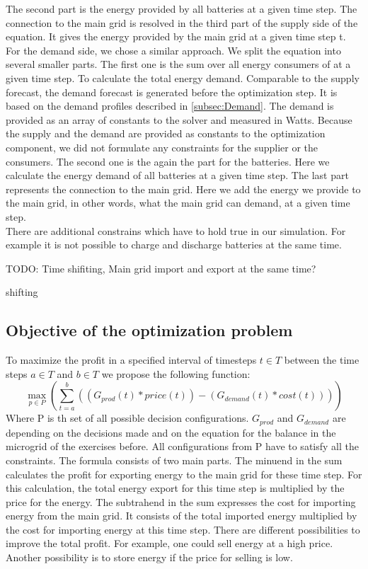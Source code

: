 The second part is the energy provided by all batteries at a given time step.
The connection to the main grid is resolved in the third part of the supply side of the equation.
It gives the energy provided by the main grid at a given time step t.\\
For the demand side, we chose a similar approach.
We split the equation into several smaller parts.
The first one is the sum over all energy consumers of at a given time step. To calculate the total energy demand. Comparable to the supply forecast, the demand forecast is generated before the optimization step. It is based on the demand profiles described in \cref{subsec:Demand}. The demand is provided as an array of constants to the solver and measured in Watts. Because the supply and the demand are provided as constants to the optimization component, we did not formulate any constraints for the supplier or the consumers.
The second one is the again the part for the batteries.
Here we calculate the energy demand of all batteries at a given time step.
The last part represents the connection to the main grid.
Here we add the energy we provide to the main grid, in other words, what the main grid can demand, at a given time step.\\

There are additional constrains which have to hold true in our simulation. 
For example it is not possible to charge and discharge batteries at the same time.

TODO: Time shifiting, Main grid import and export at the same time? 

shifting
\subsection{Objective of the optimization problem}
To maximize the profit in a specified interval of timesteps $t \in T$ between the time steps $a \in T$ and $b \in T$ we propose the following function:\\
\begin{equation} \label{eq:opt}
\max_{p \in P}{(\sum_{t=a}^{b}{((G_{prod}(t)*price(t))-(G_{demand}(t)*cost(t)))})}
\end{equation}
Where P is th set of all possible decision configurations. $G_{prod}$ and $G_{demand}$ are depending on the decisions made and on the equation for the balance in the microgrid of the exercises before. All configurations from P have to satisfy all the constraints. The formula consists of two main parts. The minuend in the sum calculates the profit for exporting energy to the main grid for these time step. For this calculation, the total energy export for this time step is multiplied by the price for the energy. The subtrahend in the sum expresses the cost for importing energy from the main grid. It consists of the total imported energy multiplied by the cost for importing energy at this time step. There are different possibilities to improve the total profit. For example, one could sell energy at a high price. Another possibility is to store energy if the price for selling is low. 

